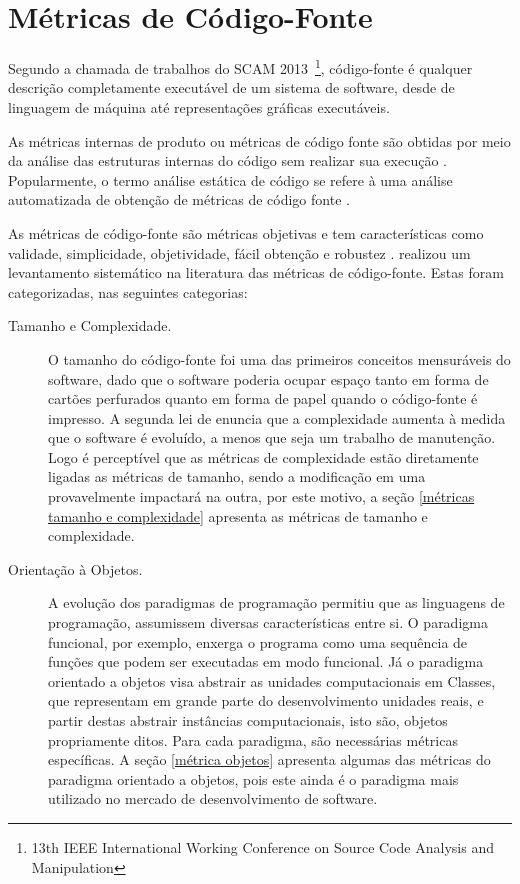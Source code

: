 				

\section {Métricas de Código-Fonte}
\label {Métricas de Código-Fonte}

Segundo a chamada de trabalhos do SCAM 2013~\footnote{13th IEEE International 
Working Conference on Source Code Analysis and Manipulation}, código-fonte é 
qualquer descrição completamente executável de um sistema de software, desde de 
linguagem de máquina até representações gráficas executáveis.

As métricas internas de produto ou métricas de código fonte são obtidas por meio
da análise das estruturas internas do código sem realizar sua execução 
\cite{Wichmann95}  \cite{Nielson:1999} \cite{Sommerville10}. Popularmente, o 
termo análise estática de código se refere à uma análise automatizada de 
obtenção de métricas de código fonte \cite{Terra2008} 
\cite{Emanuelsson2008}.

As métricas de código-fonte são métricas objetivas e tem características como 
validade, simplicidade, objetividade, fácil obtenção e robustez \cite{Mills:1999}. 
 realizou um levantamento sistemático na literatura 
das métricas de código-fonte. Estas foram categorizadas, nas seguintes 
categorias:


	\begin{description}
	\item [Tamanho e Complexidade.] O tamanho do código-fonte foi uma das 
	primeiros conceitos mensuráveis do software, dado que o software poderia 
	ocupar espaço tanto em forma de cartões perfurados quanto em forma de papel 
	quando o código-fonte é impresso. A segunda lei de  
	enuncia que a complexidade aumenta à medida que o software é evoluído, 
	a menos que seja um trabalho de manutenção. Logo é perceptível que as 
	métricas de complexidade estão diretamente ligadas as métricas de tamanho, 
	sendo a modificação em uma provavelmente impactará na outra, por este motivo,
	a seção \ref{métricas tamanho e complexidade} apresenta as métricas de tamanho e
	complexidade.
	

	\item [Orientação à Objetos.] A evolução dos paradigmas de programação 
	permitiu que as linguagens de programação, assumissem diversas 
	características entre si. O paradigma funcional, por exemplo, enxerga o 
	programa como uma sequência de funções que podem ser executadas em modo 
	funcional. Já o paradigma orientado a objetos visa abstrair as unidades 
	computacionais em Classes, que representam em grande parte do 
	desenvolvimento unidades reais, e partir destas abstrair instâncias 
	computacionais, isto são, objetos propriamente ditos. Para cada paradigma, 
	são necessárias métricas específicas. A seção \ref{métrica objetos} 
	apresenta algumas das métricas do paradigma orientado a objetos, pois este 
	ainda é o paradigma mais utilizado no mercado de desenvolvimento de 
	software. 
	\end{description}
	

